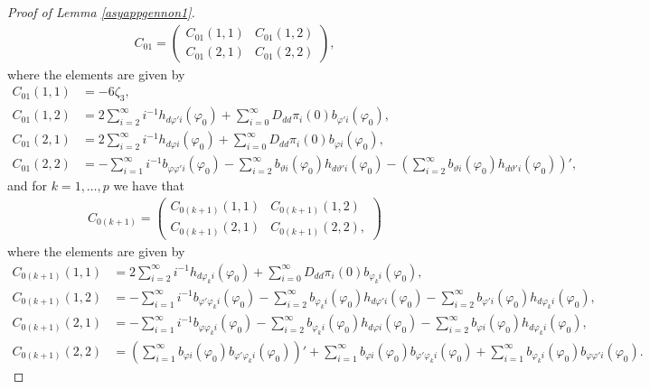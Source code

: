{{\begin{proof}[Proof of Lemma \ref{asyappgennon1}]
\begin{align}
C_{01} = \begin{pmatrix}
 C_{01}(1,1)  & C_{01}(1,2) \\
C_{01}(2,1) & C_{01}(2,2)
\end{pmatrix},  \label{genC1}
\end{align}
where the elements are given by
\begin{align*}
     C_{01}(1,1) &= -6 \zeta_3, \\
     C_{01}(1,2) &= 2 \sum_{i = 2}^{\infty} i^{-1} h_{d \varphi' i}(\varphi_0) + \sum_{i = 0}^{\infty} D_{dd} \pi_i(0) b_{\varphi'i}(\varphi_0),\\
     C_{01}(2,1) &= 2 \sum_{i = 2}^{\infty} i^{-1} h_{d \varphi i}(\varphi_0) + \sum_{i = 0}^{\infty} D_{dd} \pi_i(0) b_{\varphi i}(\varphi_0),\\
     C_{01}(2,2) &=  -\sum_{i = 1}^{\infty} i^{-1} b_{\varphi \varphi'i}(\varphi_0) -\sum_{i = 2}^{\infty}   b_{\vartheta i}(\varphi_0) h_{d \vartheta' i}(\varphi_0) - \left(\sum_{i = 2}^{\infty}   b_{\vartheta i}(\varphi_0) h_{d \vartheta' i}(\varphi_0)\right)',
\end{align*}
and for $k = 1,\dots, p$ we have that
\begin{align}
C_{0(k+1)} = \begin{pmatrix}
 C_{0(k+1)}(1,1)  & C_{0(k+1)}(1,2) \\
C_{0(k+1)}(2,1) & C_{0(k+1)}(2,2),
\end{pmatrix}  \label{genCk}
\end{align}
where the elements are given by
\begin{align*}
     C_{0(k+1)}(1,1) &= 2 \sum_{i = 2}^{\infty} i^{-1} h_{d \varphi_k i}(\varphi_0)  + \sum_{i = 0}^{\infty} D_{dd} \pi_i(0) b_{\varphi_k i}(\varphi_0),   \\
     C_{0(k+1)}(1,2) &= -\sum_{i = 1}^{\infty} i^{-1} b_{\varphi' \varphi_k i}(\varphi_0) -    \sum_{i = 2}^{\infty}   b_{\varphi_k i}(\varphi_0) h_{d \varphi'  i}(\varphi_0) -  \sum_{i = 2}^{\infty}   b_{\varphi'  i}(\varphi_0) h_{d \varphi_k  i}(\varphi_0),   \\
     C_{0(k+1)}(2,1) &= -\sum_{i = 1}^{\infty} i^{-1} b_{\varphi \varphi_k i}(\varphi_0) -    \sum_{i = 2}^{\infty}   b_{\varphi_k i}(\varphi_0) h_{d \varphi  i}(\varphi_0) -  \sum_{i = 2}^{\infty}   b_{\varphi  i}(\varphi_0) h_{d \varphi_k  i}(\varphi_0),  \\
    C_{0(k+1)}(2,2) &= \left( \sum_{i = 1}^{\infty}  b_{\varphi i}(\varphi_0) b_{\varphi' \varphi_k i}(\varphi_0) \right)' + \sum_{i = 1}^{\infty}  b_{\varphi  i}(\varphi_0) b_{\varphi' \varphi_k i}(\varphi_0)  + \sum_{i = 1}^{\infty}  b_{\varphi_k i}(\varphi_0) b_{\varphi \varphi' i}(\varphi_0).
\end{align*}











\end{proof}}}
